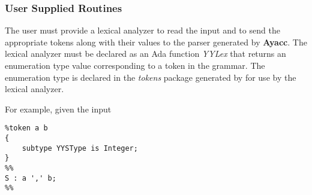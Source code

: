 \subsubsection{User Supplied Routines}
The user must provide a lexical analyzer to read the input and to send
the appropriate tokens along with their values to the parser
generated by {\bf Ayacc}.  The lexical analyzer must be declared as an
Ada function
{\it YYLex}
that returns an enumeration type value corresponding
to a token in the grammar.  The enumeration type is declared in the
{\it tokens}
package generated by \ayacc for use by the lexical analyzer.

For example, given the input
\begin{verbatim}
%token a b
{
    subtype YYSType is Integer;
}
%%
S : a ',' b;
%%
\end{verbatim}


